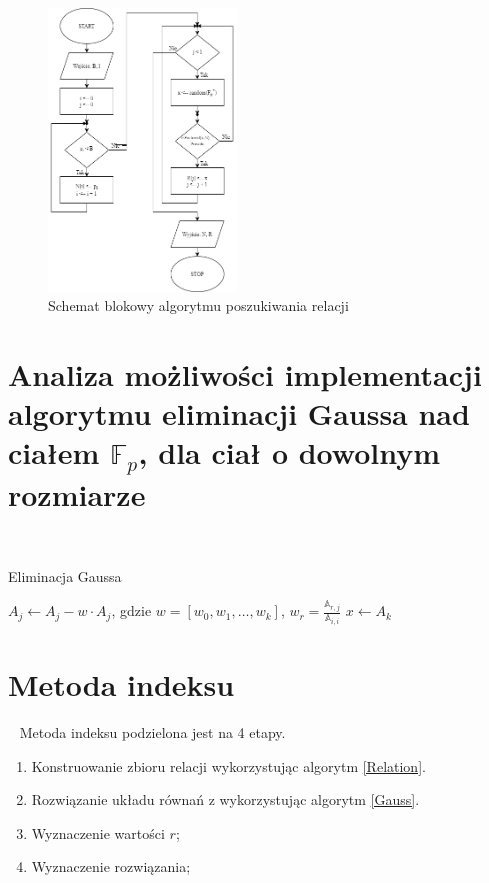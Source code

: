 \documentclass[]{article}
\begin{document}
\begin{figure}[H]
	\begin{center}
		\includegraphics[width=5cm]{./img/2.png}
		\caption{Schemat blokowy algorytmu poszukiwania relacji}
	\end{center}
\end{figure}


\section{Analiza możliwości implementacji algorytmu eliminacji Gaussa nad ciałem $\mathbb{F}_p$, dla ciał o dowolnym rozmiarze}~
	\begin{algorithm}[H]
		\SetAlgoLined
		\caption{Eliminacja Gaussa}
		\label{Gauss}
		{
			{
				\(A_{j} \gets A_{j}  - w \cdot A_{j}\), gdzie \(w = [w_0, w_1, \dots, w_k]\), \(w_r = \frac{\mathbb{A}_{r,j}}{\mathbb{A}_{i,i}}\)
			}
		}
	\(x \gets A_{k}\)\\
	\end{algorithm}


\newpage
\section{Metoda indeksu}~
	Metoda indeksu podzielona jest na 4 etapy. 
	\begin{enumerate}
		\item Konstruowanie zbioru relacji wykorzystując algorytm \ref{Relation}.
		\item Rozwiązanie układu równań z wykorzystując algorytm \ref{Gauss}.
		\item Wyznaczenie wartości \(r\);
		\item Wyznaczenie rozwiązania;
	\end{enumerate}
\end{document}
